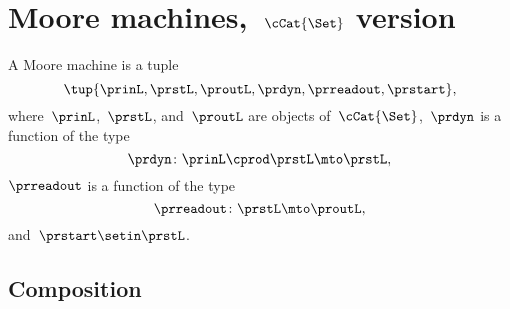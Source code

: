
\section{Moore machines,~$\cCat{\Set}$ version}

\begin{definition}
    \label{def:moore_machine_3rd}
    A Moore machine is a tuple
    \begin{equation}
        \label{eq:moore-tuple-improved-again}
        \tup{\prinL,\prstL,\proutL,\prdyn,\prreadout,\prstart},
    \end{equation}
    where~$\prinL$,~$\prstL$, and~$\proutL$ are objects of~$\cCat{\Set}$,~$\prdyn$ is a function of the type
    \begin{equation}
        \prdyn \colon \prinL \cprod \prstL \mto \prstL,
    \end{equation}
    $\prreadout$ is a function of the type
    \begin{equation}
        \prreadout \colon \prstL \mto \proutL,
    \end{equation}
    and~$\prstart \setin \prstL$.
\end{definition}

\subsection{Composition}
\label{sec:composition-of-Moore-machines}

